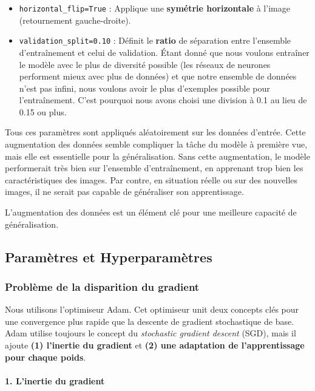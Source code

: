\documentclass{article}
\begin{document}
\begin{itemize}
    \item \texttt{horizontal\_flip=True} : Applique une \textbf{symétrie horizontale} à l’image (retournement gauche-droite).

    \item \texttt{validation\_split=0.10} : Définit le \textbf{ratio} de séparation entre l’ensemble d'entraînement et celui de validation. Étant donné que nous voulons entraîner le modèle avec le plus de diversité possible (les réseaux de neurones performent mieux avec plus de données) et que notre ensemble de données n’est pas infini, nous voulons avoir le plus d’exemples possible pour l'entraînement. C’est pourquoi nous avons choisi une division à 0.1 au lieu de 0.15 ou plus.
\end{itemize}

Tous ces paramètres sont appliqués aléatoirement sur les données d’entrée. Cette augmentation des données semble compliquer la tâche du modèle à première vue, mais elle est essentielle pour la généralisation. Sans cette augmentation, le modèle performerait très bien sur l’ensemble d'entraînement, en apprenant trop bien les caractéristiques des images. Par contre, en situation réelle ou sur des nouvelles images, il ne serait pas capable de généraliser son apprentissage.

L’augmentation des données est un élément clé pour une meilleure capacité de généralisation.

\subsection{ Paramètres et Hyperparamètres}

\subsubsection*{Problème de la disparition du gradient}

Nous utilisons l'optimiseur Adam. Cet optimiseur unit deux concepts clés pour une convergence plus rapide que la descente de gradient stochastique de base. Adam utilise toujours le concept du \emph{stochastic gradient descent} (SGD), mais il ajoute \textbf{(1) l'inertie du gradient} et \textbf{(2) une adaptation de l'apprentissage pour chaque poids}.

\paragraph{1. L'inertie du gradient}
\end{document}
